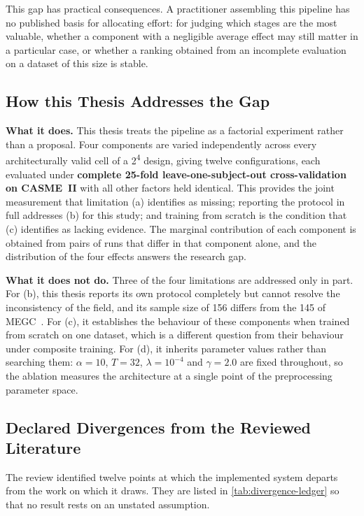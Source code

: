 This gap has practical consequences. A practitioner assembling this pipeline has no published basis for allocating effort: for judging which stages are the most valuable, whether a component with a negligible average effect may still matter in a particular case, or whether a ranking obtained from an incomplete evaluation on a dataset of this size is stable.

\subsection{How this Thesis Addresses the Gap}
\label{sec:addressing-gap}

\textbf{What it does.} This thesis treats the pipeline as a factorial experiment rather than a proposal. Four components are varied independently across every architecturally valid cell of a 2\textsuperscript{4} design, giving twelve configurations, each evaluated under \textbf{complete 25-fold leave-one-subject-out cross-validation on CASME~II} with all other factors held identical. This provides the joint measurement that limitation (a) identifies as missing; reporting the protocol in full addresses (b) for this study; and training from scratch is the condition that (c) identifies as lacking evidence. The marginal contribution of each component is obtained from pairs of runs that differ in that component alone, and the distribution of the four effects answers the research gap.

\textbf{What it does not do.} Three of the four limitations are addressed only in part. For (b), this thesis reports its own protocol completely but cannot resolve the inconsistency of the field, and its sample size of 156 differs from the 145 of MEGC~\cite{see2019}. For (c), it establishes the behaviour of these components when trained from scratch on one dataset, which is a different question from their behaviour under composite training. For (d), it inherits parameter values rather than searching them: $\alpha = 10$, $T = 32$, $\lambda = 10^{-4}$ and $\gamma = 2.0$ are fixed throughout, so the ablation measures the architecture at a single point of the preprocessing parameter space.

\subsection{Declared Divergences from the Reviewed Literature}
\label{sec:divergence-ledger}

The review identified twelve points at which the implemented system departs from the work on which it draws. They are listed in \autoref{tab:divergence-ledger} so that no result rests on an unstated assumption.

